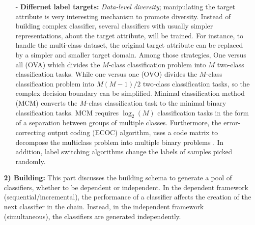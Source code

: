 \begin{itemize}
  \item[-]\textbf{Differnet label targets:} \textit{Data-level diversity}; manipulating the target attribute is very interesting mechanism to promote diversity. Instead of building complex classifier, several classifiers with usually simpler representations, about the target attribute, will be trained. For instance, to handle the multi-class dataset, the original target attribute can be replaced by a simpler and smaller target domain. Among those strategies, One versus all (OVA) \cite{anand1995} which divides the $M$-class classification problem into $M$ two-class classification tasks. While one versus one (OVO) \cite{lu1999} divides the $M$-class classification problem into $M(M-1)/2$ two-class classification tasks, so the complex decision boundary can be simplified. Minimal classification method (MCM) \cite{sivalingam2005} converts the $M$-class classification task to the minimal binary classification tasks. MCM requires $\log_2(M)$ classification tasks in the form of a separation between groups of multiple classes. Furthermore, the error-correcting output coding (ECOC) algorithm, uses a code matrix to decompose the multiclass problem into multiple binary problems \cite{dietterich1994}. In addition, label switching algorithms \cite{breiman2000,martinez2005} change the labels of samples picked randomly. 
\end{itemize}


\textbf{2) Building:}
This part discusses the building schema to generate a pool of classifiers, whether to be dependent or independent. In the dependent framework (sequential/incremental), the performance of a classifier affects the creation of the next classifier in the chain. Instead, in the independent framework (simultaneous), the classifiers are generated independently. 


